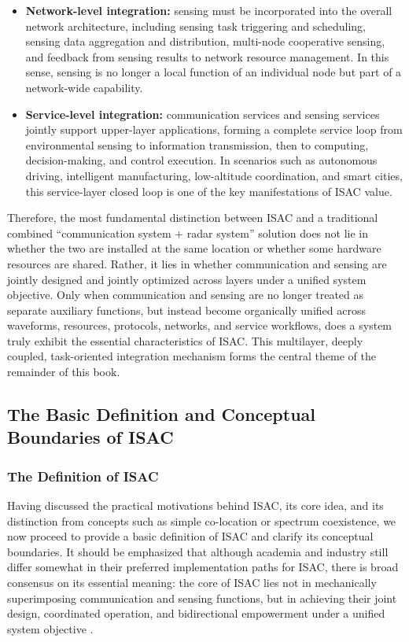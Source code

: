 \begin{itemize}
    \item \textbf{Network-level integration:} sensing must be incorporated into the overall network architecture, including sensing task triggering and scheduling, sensing data aggregation and distribution, multi-node cooperative sensing, and feedback from sensing results to network resource management. In this sense, sensing is no longer a local function of an individual node but part of a network-wide capability.

    \item \textbf{Service-level integration:} communication services and sensing services jointly support upper-layer applications, forming a complete service loop from environmental sensing to information transmission, then to computing, decision-making, and control execution. In scenarios such as autonomous driving, intelligent manufacturing, low-altitude coordination, and smart cities, this service-layer closed loop is one of the key manifestations of ISAC value.
\end{itemize}

\begin{sloppypar}
Therefore, the most fundamental distinction between ISAC and a traditional combined ``communication system + radar system'' solution does not lie in whether the two are installed at the same location or whether some hardware resources are shared. Rather, it lies in whether communication and sensing are jointly designed and jointly optimized across layers under a unified system objective. Only when communication and sensing are no longer treated as separate auxiliary functions, but instead become organically unified across waveforms, resources, protocols, networks, and service workflows, does a system truly exhibit the essential characteristics of ISAC. This multilayer, deeply coupled, task-oriented integration mechanism forms the central theme of the remainder of this book.
\end{sloppypar}

\subsection{The Basic Definition and Conceptual Boundaries of ISAC}
\label{subsec:ch1-basic-definition}
\subsubsection{The Definition of ISAC}
\label{subsubsec:ch1-definition-isac}

Having discussed the practical motivations behind ISAC, its core idea, and its distinction from concepts such as simple co-location or spectrum coexistence, we now proceed to provide a basic definition of ISAC and clarify its conceptual boundaries. It should be emphasized that although academia and industry still differ somewhat in their preferred implementation paths for ISAC, there is broad consensus on its essential meaning: the core of ISAC lies not in mechanically superimposing communication and sensing functions, but in achieving their joint design, coordinated operation, and bidirectional empowerment under a unified system objective \cite{Liu2022ISAC,Liu2020JointRadarComm}.

